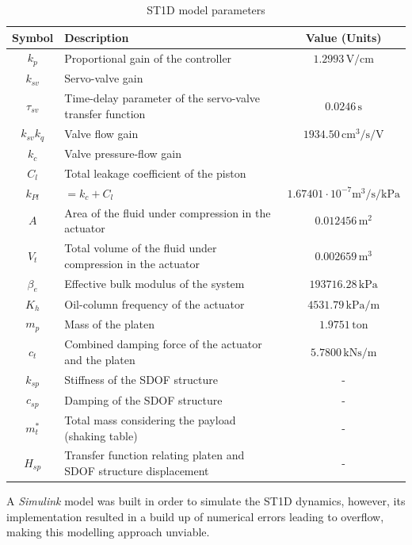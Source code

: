 \documentclass[10pt]{extarticle}
\begin{document}
\begin{table}[H]
\centering
\caption{ST1D model parameters \citep{tekeste2021}}
\begin{tabular}{|c|l|c|}
\hline
\textbf{Symbol} & \textbf{Description} & \textbf{Value (Units)} \\ \hline
$k_p$ & Proportional gain of the controller & $1.2993 \, \text{V/cm}$ \\ \hline
$k_{sv}$ & Servo-valve gain &  \\ \hline %
$\tau_{sv}$ & Time-delay parameter of the servo-valve transfer function & $0.0246 \, \text{s}$ \\ \hline
$k_{sv}k_q$ & Valve flow gain & $1934.50 \, \text{cm}^3/\text{s/V}$ \\ \hline %
$k_c$ & Valve pressure-flow gain &   \\ \hline %
$C_l$ & Total leakage coefficient of the piston &  \\ \hline %
$ k_{Pl}$ & $ = k_c + C_l $ & $ 1.67401\cdot 10^{-7}   \text{m}^3/\text{s/kPa} $\\ \hline
$A$ & Area of the fluid under compression in the actuator & $0.012456 \, \text{m}^2$ \\ \hline
$V_t$ & Total volume of the fluid under compression in the actuator & $0.002659 \, \text{m}^3$ \\ \hline
$\beta_e$ & Effective bulk modulus of the system & $193716.28 \, \text{kPa}$ \\ \hline
$K_h$ & Oil-column frequency of the actuator & $4531.79 \, \text{kPa/m}$ \\ \hline
$m_p$ & Mass of the platen & $1.9751 \, \text{ton}$ \\ \hline
$c_t$ & Combined damping force of the actuator and the platen & $5.7800 \, \text{kNs/m}$ \\ \hline
$k_{sp}$ & Stiffness of the SDOF structure & - \\ \hline
$c_{sp}$ & Damping of the SDOF structure & - \\ \hline
$m_t^*$ & Total mass considering the payload (shaking table) & - \\ \hline
$H_{sp}$ & Transfer function relating platen and SDOF structure displacement & - \\ \hline
\end{tabular}
\label{tab:parameters}
\end{table}


A \textit{Simulink} model %
was built in order to simulate the ST1D dynamics, however, its implementation resulted in a build up of numerical errors leading to overflow, making this modelling approach unviable.
\end{document}
